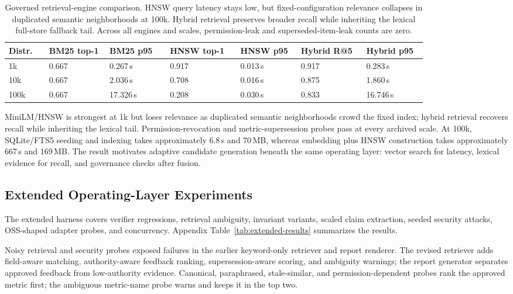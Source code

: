 \documentclass[10pt]{article}
\begin{document}
\begin{table}[H]
\centering
\scriptsize
\setlength{\tabcolsep}{2.5pt}
\begin{tabular}{C{0.08\linewidth}C{0.12\linewidth}C{0.12\linewidth}C{0.14\linewidth}C{0.12\linewidth}C{0.13\linewidth}C{0.12\linewidth}}
\toprule
\textbf{Distr.} & \textbf{BM25 top-1} & \textbf{BM25 p95} & \textbf{HNSW top-1} & \textbf{HNSW p95} & \textbf{Hybrid R@5} & \textbf{Hybrid p95} \\
\midrule
1k & 0.667 & 0.267\,s & 0.917 & 0.013\,s & 0.917 & 0.283\,s \\
10k & 0.667 & 2.036\,s & 0.708 & 0.016\,s & 0.875 & 1.860\,s \\
100k & 0.667 & 17.326\,s & 0.208 & 0.030\,s & 0.833 & 16.746\,s \\
\bottomrule
\end{tabular}
\caption{Governed retrieval-engine comparison. HNSW query latency stays low, but fixed-configuration relevance collapses in duplicated semantic neighborhoods at 100k. Hybrid retrieval preserves broader recall while inheriting the lexical full-store fallback tail. Across all engines and scales, permission-leak and superseded-item-leak counts are zero.}
\label{tab:retrieval-engines}
\end{table}

MiniLM/HNSW is strongest at 1k but loses relevance as duplicated semantic neighborhoods crowd the fixed index; hybrid retrieval recovers recall while inheriting the lexical tail. Permission-revocation and metric-supersession probes pass at every archived scale. At 100k, SQLite/FTS5 seeding and indexing takes approximately 6.8\,s and 70\,MB, whereas embedding plus HNSW construction takes approximately 667\,s and 169\,MB. The result motivates adaptive candidate generation beneath the same operating layer: vector search for latency, lexical evidence for recall, and governance checks after fusion.

\subsection{Extended Operating-Layer Experiments}\label{sec:extended-experiments}
The extended harness covers verifier regressions, retrieval ambiguity, invariant variants, scaled claim extraction, seeded security attacks, OSS-shaped adapter probes, and concurrency. Appendix Table~\ref{tab:extended-results} summarizes the results.

Noisy retrieval and security probes exposed failures in the earlier keyword-only retriever and report renderer. The revised retriever adds field-aware matching, authority-aware feedback ranking, supersession-aware scoring, and ambiguity warnings; the report generator separates approved feedback from low-authority evidence. Canonical, paraphrased, stale-similar, and permission-dependent probes rank the approved metric first; the ambiguous metric-name probe warns and keeps it in the top two.
\end{document}
